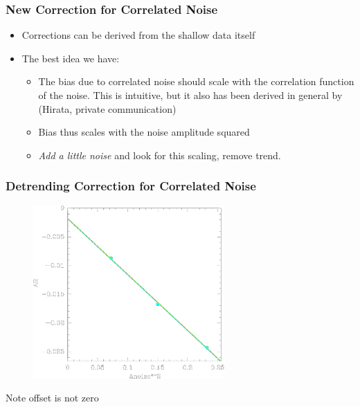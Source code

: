 \documentclass{beamer}
\begin{document}
\frame
{
    \frametitle{New Correction for Correlated Noise}

 
    \begin{itemize}

        \item Corrections can be derived from the shallow data itself

        \item The best idea we have:
            \begin{itemize}

                \item The bias due to correlated noise should scale with the
                    {\color{gold} correlation function} of the noise.
                    This is intuitive, but it also has been derived in general
                    by (Hirata, private communication)

                \item Bias thus scales with the {\color{gold} noise} amplitude squared

                \item {\em Add a little noise} and look for this scaling, remove trend.

            \end{itemize}
    \end{itemize}

}



\frame
{
    \frametitle{Detrending Correction for Correlated Noise}

    \begin{figure}
        \includegraphics[width=0.65\textwidth]{run-bd13mcal-dt01-Rnoise-detrend-neg.png}
    \end{figure}

    Note offset is not zero
}
\end{document}
